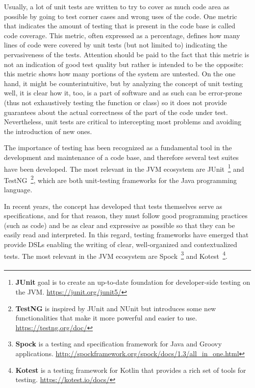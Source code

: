 Usually, a lot of unit tests are written to try to cover as much code area as possible by going to test corner cases and wrong uses of the code.
One metric that indicates the amount of testing that is present in the code base is called code coverage.
This metric, often expressed as a percentage, defines how many lines of code were covered by unit tests (but not limited to) indicating the
pervasiveness of the tests. Attention should be paid to the fact that this metric is not an indication of good test quality but rather is intended to
be the opposite: this metric shows how many portions of the system are untested.
On the one hand, it might be counterintuitive, but by analyzing the concept of unit testing well, it is clear how it, too, is a part of software and
as such can be error-prone (thus not exhaustively testing the function or class) so it does not provide guarantees about the actual correctness of
the part of the code under test.
Nevertheless, unit tests are critical to intercepting most problems and avoiding the introduction of new ones.

The importance of testing has been recognized as a fundamental tool in the development and maintenance of a code base, and therefore
several test suites have been developed.
The most relevant in the JVM ecosystem are JUnit~\footnote{\textbf{JUnit} goal is to create an up-to-date foundation for developer-side testing on
	the JVM. \url{https://junit.org/junit5/}}
and TestNG~\footnote{\textbf{TestNG} is inspired by JUnit and NUnit but introduces some new functionalities that make it more powerful and easier to
	use. \url{https://testng.org/doc/}}, which are both unit-testing frameworks for the Java programming language.

In recent years, the concept has developed that tests themselves serve as specifications, and for that reason, they must follow good programming
practices (such as code) and be as clear and expressive as possible so that they can be easily read and interpreted.
In this regard, testing frameworks have emerged that provide DSLs enabling the writing of clear, well-organized and contextualized tests.
The most relevant in the JVM ecosystem are Spock~\footnote{\textbf{Spock} is a testing and specification framework for Java and Groovy applications.
	\url{http://spockframework.org/spock/docs/1.3/all\_in\_one.html}} and Kotest~\footnote{\textbf{Kotest} is a testing framework for Kotlin that
	provides a rich set of tools for testing. \url{https://kotest.io/docs/}}.

\paragraph*{}

